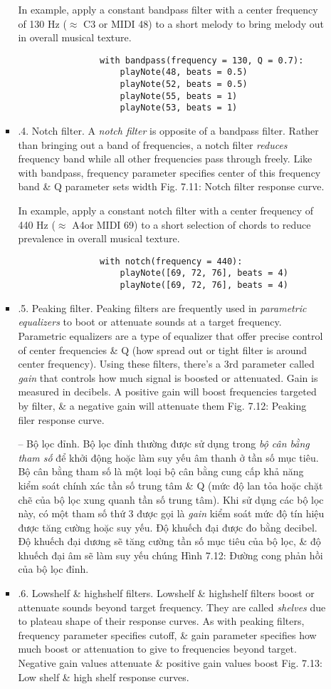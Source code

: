 \documentclass{article}
\begin{document}
\begin{itemize}
\begin{itemize}
\begin{itemize}
			In example, apply a constant bandpass filter with a center frequency of 130 Hz ($\approx$ C3 or MIDI 48) to a short melody to bring melody out in overall musical texture.
			\begin{verbatim}
				with bandpass(frequency = 130, Q = 0.7):
				    playNote(48, beats = 0.5)
				    playNote(52, beats = 0.5)
				    playNote(55, beats = 1)
				    playNote(53, beats = 1)
			\end{verbatim}
			\item {.4. Notch filter.} A {\it notch filter} is opposite of a bandpass filter. Rather than bringing out a band of frequencies, a notch filter {\it reduces} frequency band while all other frequencies pass through freely. Like with bandpass, frequency parameter specifies center of this frequency band \& Q parameter sets width {\sf Fig. 7.11: Notch filter response curve}.
			
			In example, apply a constant notch filter with a center frequency of 440 Hz ($\approx$ A4or MIDI 69) to a short selection of chords to reduce prevalence in overall musical texture.
			\begin{verbatim}
				with notch(frequency = 440):
				    playNote([69, 72, 76], beats = 4)
				    playNote([69, 72, 76], beats = 4)
			\end{verbatim}
			\item {.5. Peaking filter.} Peaking filters are frequently used in {\it parametric equalizers} to boot or attenuate sounds at a target frequency. Parametric equalizers are a type of equalizer that offer precise control of center frequencies \& Q (how spread out or tight filter is around center frequency). Using these filters, there's a 3rd parameter called {\it gain} that controls how much signal is boosted or attenuated. Gain is measured in decibels. A positive gain will boost frequencies targeted by filter, \& a negative gain will attenuate them {\sf Fig. 7.12: Peaking filer response curve.}
			
			-- {\sf Bộ lọc đỉnh.} Bộ lọc đỉnh thường được sử dụng trong {\it bộ cân bằng tham số} để khởi động hoặc làm suy yếu âm thanh ở tần số mục tiêu. Bộ cân bằng tham số là một loại bộ cân bằng cung cấp khả năng kiểm soát chính xác tần số trung tâm \& Q (mức độ lan tỏa hoặc chặt chẽ của bộ lọc xung quanh tần số trung tâm). Khi sử dụng các bộ lọc này, có một tham số thứ 3 được gọi là {\it gain} kiểm soát mức độ tín hiệu được tăng cường hoặc suy yếu. Độ khuếch đại được đo bằng decibel. Độ khuếch đại dương sẽ tăng cường tần số mục tiêu của bộ lọc, \& độ khuếch đại âm sẽ làm suy yếu chúng {\sf Hình 7.12: Đường cong phản hồi của bộ lọc đỉnh.}
			\item {.6. Lowshelf \& highshelf filters.} Lowshelf \& highshelf filters boost or attenuate sounds beyond target frequency. They are called {\it shelves} due to plateau shape of their response curves. As with peaking filters, frequency parameter specifies cutoff, \& gain parameter specifies how much boost or attenuation to give to frequencies beyond target. Negative gain values attenuate \& positive gain values boost {\sf Fig. 7.13: Low shelf \& high shelf response curves.}
			

\end{itemize}
\end{itemize}
\end{itemize}
\end{document}
